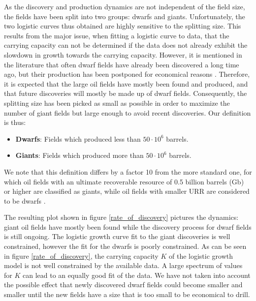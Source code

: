 \documentclass[review]{elsarticle}
\begin{document}
As the discovery and production dynamics are not independent of the
field size, the fields have been split into two groups: dwarfs and
giants. Unfortunately, the two logistic curves thus obtained are highly
sensitive to the splitting size. This results from the major issue,
when fitting a logistic curve to data, that the carrying capacity
can not be determined if the data does not already exhibit the slowdown 
in growth towards the carrying capacity. However, it is
mentioned in the literature that often dwarf fields have already been
discovered a long time ago, but their production has been postponed
for economical reasons \cite[p. 378]{Lynch2002}. Therefore, it is
expected that the large oil fields have mostly been found and produced,
and that future discoveries will mostly be made up of dwarf fields.
Consequently, the splitting size has been picked as small as possible
in order to maximize the number of giant fields but large enough to
avoid recent discoveries. Our definition is thus:
\begin{itemize}
\item \textbf{Dwarfs}: Fields which produced less than $50\cdot10^{6}$
barrels.
\item \textbf{Giants}: Fields which produced more than $50\cdot10^{6}$
barrels.
\end{itemize}
We note that this definition differs by a factor 10 from the more standard one, for which
oil fields with an ultimate recoverable resource of 0.5 billion barrels (Gb) 
or higher are classified as giants, while oil fields with smaller URR are considered to be dwarfs
\citep{Hook2008}.

The resulting plot shown in figure \ref{rate_of_discovery} pictures
the dynamics: giant oil fields have mostly been found while the discovery
process for dwarf fields is still ongoing. The logistic growth curve
fit to the giant discoveries is well constrained, however the fit
for the dwarfs is poorly constrained. As can be seen in figure \ref{rate_of_discovery},
the carrying capacity $K$ of the logistic growth model is not well
constrained by the available data. A large spectrum of values for
$K$ can lead to an equally good fit of the data. We have not taken
into account the possible effect that
newly discovered dwarf fields could become smaller and smaller 
until the new fields have a size that is too small to be economical to drill.
\end{document}
